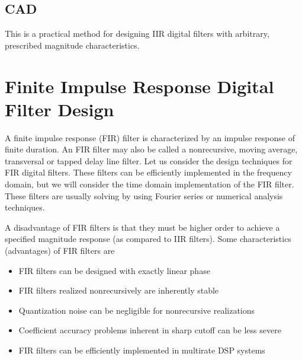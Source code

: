\documentclass[11pt]{book}
\theoremstyle{example}
\begin{document}
\section{CAD}

This is a practical method for designing IIR digital filters with arbitrary, prescribed magnitude characteristics.

\chapter[FIR Digital Filter Design]{Finite Impulse Response Digital Filter Design}

A finite impulse response (FIR) filter is characterized by an impulse response of finite duration. An FIR filter may also be called a nonrecursive, moving average, transversal or tapped delay line filter. Let us consider the design techniques for FIR digital filters. These filters can be efficiently implemented in the frequency domain, but we will consider the time domain implementation of the FIR filter. These filters are usually solving by using Fourier series or numerical analysis techniques.

A disadvantage of FIR filters is that they must be higher order to achieve a specified magnitude response (as compared to IIR filters). Some characteristics (advantages) of FIR filters are
\begin{itemize}
	\item FIR filters can be designed with exactly linear phase
	\item FIR filters realized nonrecursively are inherently stable
	\item Quantization noise can be negligible for nonrecursive realizations
	\item Coefficient accuracy problems inherent in sharp cutoff can be less severe
	\item FIR filters can be efficiently implemented in multirate DSP systems
\end{itemize}
\end{document}
